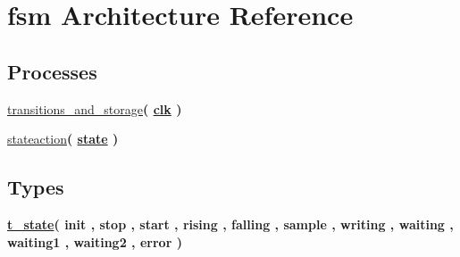 \hypertarget{class_s_c_l__detect_1_1fsm}{}\section{fsm Architecture Reference}
\label{class_s_c_l__detect_1_1fsm}
\subsection*{Processes}
 \begin{DoxyCompactItemize}
\item 
\hyperlink{class_s_c_l__detect_1_1fsm_aca869937c40a3cb0b3e8467b28f4c42b}{transitions\+\_\+and\+\_\+storage}{\bfseries  ( {\bfseries {\bfseries \hyperlink{class_s_c_l__detect_a6231b307b7958b6060563aa2a93d345a}{clk}} \textcolor{vhdlchar}{ }} )}
\item 
\hyperlink{class_s_c_l__detect_1_1fsm_ab52d69072c9e0a01dc1a2642b28297ab}{stateaction}{\bfseries  ( {\bfseries {\bfseries \hyperlink{class_s_c_l__detect_1_1fsm_a3faeb1655b4935d9040ff50adfdcd5f0}{state}} \textcolor{vhdlchar}{ }} )}
\end{DoxyCompactItemize}
\subsection*{Types}
 \begin{DoxyCompactItemize}
\item 
{\bfseries \hyperlink{class_s_c_l__detect_1_1fsm_a5653729522f0b754a9aa9312cc16b167}{t\+\_\+state}{\bfseries \textcolor{vhdlchar}{(}\textcolor{vhdlchar}{ }\textcolor{vhdlchar}{init}\textcolor{vhdlchar}{ }\textcolor{vhdlchar}{,}\textcolor{vhdlchar}{ }\textcolor{vhdlchar}{stop}\textcolor{vhdlchar}{ }\textcolor{vhdlchar}{,}\textcolor{vhdlchar}{ }\textcolor{vhdlchar}{start}\textcolor{vhdlchar}{ }\textcolor{vhdlchar}{,}\textcolor{vhdlchar}{ }\textcolor{vhdlchar}{rising}\textcolor{vhdlchar}{ }\textcolor{vhdlchar}{,}\textcolor{vhdlchar}{ }\textcolor{vhdlchar}{falling}\textcolor{vhdlchar}{ }\textcolor{vhdlchar}{,}\textcolor{vhdlchar}{ }\textcolor{vhdlchar}{sample}\textcolor{vhdlchar}{ }\textcolor{vhdlchar}{,}\textcolor{vhdlchar}{ }\textcolor{vhdlchar}{writing}\textcolor{vhdlchar}{ }\textcolor{vhdlchar}{,}\textcolor{vhdlchar}{ }\textcolor{vhdlchar}{waiting}\textcolor{vhdlchar}{ }\textcolor{vhdlchar}{,}\textcolor{vhdlchar}{ }\textcolor{vhdlchar}{waiting1}\textcolor{vhdlchar}{ }\textcolor{vhdlchar}{,}\textcolor{vhdlchar}{ }\textcolor{vhdlchar}{waiting2}\textcolor{vhdlchar}{ }\textcolor{vhdlchar}{,}\textcolor{vhdlchar}{ }\textcolor{vhdlchar}{error}\textcolor{vhdlchar}{ }\textcolor{vhdlchar}{)}\textcolor{vhdlchar}{ }}} 
\end{DoxyCompactItemize}
